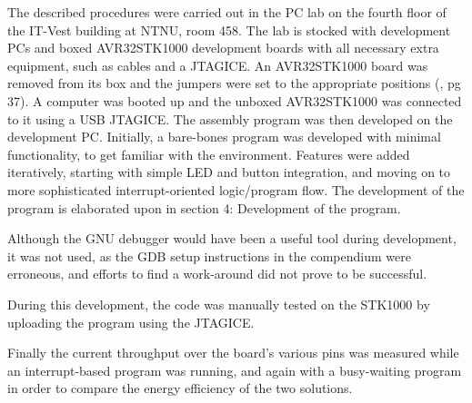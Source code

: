 The described procedures were carried out in the PC lab on the fourth floor of the IT-Vest building at NTNU, room 458.
The lab is stocked with development PCs and boxed AVR32STK1000 development boards with all necessary extra equipment, such as cables and a JTAGICE.
An AVR32STK1000 board was removed from its box and the jumpers were set to the appropriate positions (\cite{lab-compendium}, pg 37).
A computer was booted up and the unboxed AVR32STK1000 was connected to it using a USB JTAGICE.
The assembly program was then developed on the development PC.
Initially, a bare-bones program was developed with minimal functionality, to get familiar with the environment.
Features were added iteratively, starting with simple LED and button integration, and moving on to more sophisticated interrupt-oriented logic/program flow.
The development of the program is elaborated upon in section 4: Development of the program.

Although the GNU debugger would have been a useful tool during development, it was not used, as the GDB setup instructions in the compendium \cite{lab-compendium} were erroneous, and efforts to find a work-around did not prove to be successful.

During this development, the code was manually tested on the STK1000 by uploading the program using the JTAGICE.


Finally the current throughput over the board's various pins was measured while an interrupt-based program was running, and again with a busy-waiting program in order to compare the energy efficiency of the two solutions.
